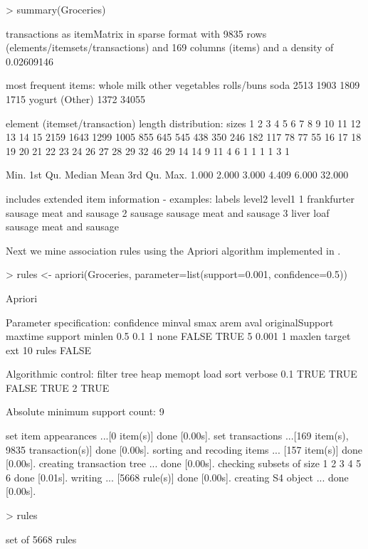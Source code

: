 \documentclass[nojss]{jss}
\begin{document}
\begin{Schunk}
\begin{Sinput}
> summary(Groceries)
\end{Sinput}
\begin{Soutput}
transactions as itemMatrix in sparse format with
 9835 rows (elements/itemsets/transactions) and
 169 columns (items) and a density of 0.02609146 

most frequent items:
      whole milk other vegetables       rolls/buns             soda 
            2513             1903             1809             1715 
          yogurt          (Other) 
            1372            34055 

element (itemset/transaction) length distribution:
sizes
   1    2    3    4    5    6    7    8    9   10   11   12   13   14   15 
2159 1643 1299 1005  855  645  545  438  350  246  182  117   78   77   55 
  16   17   18   19   20   21   22   23   24   26   27   28   29   32 
  46   29   14   14    9   11    4    6    1    1    1    1    3    1 

   Min. 1st Qu.  Median    Mean 3rd Qu.    Max. 
  1.000   2.000   3.000   4.409   6.000  32.000 

includes extended item information - examples:
       labels  level2           level1
1 frankfurter sausage meat and sausage
2     sausage sausage meat and sausage
3  liver loaf sausage meat and sausage
\end{Soutput}
\end{Schunk}

Next we mine association rules using the Apriori algorithm implemented
in .

\begin{Schunk}
\begin{Sinput}
> rules <- apriori(Groceries, parameter=list(support=0.001, confidence=0.5))
\end{Sinput}
\begin{Soutput}
Apriori

Parameter specification:
 confidence minval smax arem  aval originalSupport maxtime support minlen
        0.5    0.1    1 none FALSE            TRUE       5   0.001      1
 maxlen target   ext
     10  rules FALSE

Algorithmic control:
 filter tree heap memopt load sort verbose
    0.1 TRUE TRUE  FALSE TRUE    2    TRUE

Absolute minimum support count: 9 

set item appearances ...[0 item(s)] done [0.00s].
set transactions ...[169 item(s), 9835 transaction(s)] done [0.00s].
sorting and recoding items ... [157 item(s)] done [0.00s].
creating transaction tree ... done [0.00s].
checking subsets of size 1 2 3 4 5 6 done [0.01s].
writing ... [5668 rule(s)] done [0.00s].
creating S4 object  ... done [0.00s].
\end{Soutput}
\begin{Sinput}
> rules
\end{Sinput}
\begin{Soutput}
set of 5668 rules 
\end{Soutput}
\end{Schunk}
\end{document}
